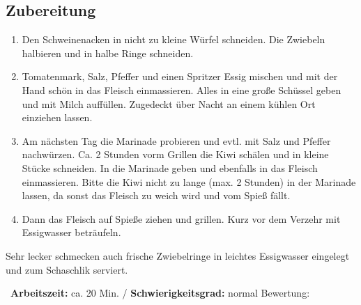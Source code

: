 \begin{minipage}[t]{0.58\textwidth}
\vspace{0pt}
\subsection*{Zubereitung}
\begin{enumerate}[leftmargin=*, itemindent=14pt]
\item Den Schweinenacken in nicht zu kleine Würfel schneiden. Die Zwiebeln halbieren und in halbe Ringe schneiden. 

\item Tomatenmark, Salz, Pfeffer und einen Spritzer Essig mischen und mit der Hand schön in das Fleisch einmassieren. Alles in eine große Schüssel geben und mit Milch auffüllen. Zugedeckt über Nacht an einem kühlen Ort einziehen lassen.

\item Am nächsten Tag die Marinade probieren und evtl. mit Salz und Pfeffer nachwürzen. Ca. 2 Stunden vorm Grillen die Kiwi schälen und in kleine Stücke schneiden. In die Marinade geben und ebenfalls in das Fleisch einmassieren. Bitte die Kiwi nicht zu lange (max. 2 Stunden) in der Marinade lassen, da sonst das Fleisch zu weich wird und vom Spieß fällt.

\item Dann das Fleisch auf Spieße ziehen und grillen. Kurz vor dem Verzehr mit Essigwasser beträufeln. 
\end{enumerate}
Sehr lecker schmecken auch frische Zwiebelringe in leichtes Essigwasser eingelegt und zum Schaschlik serviert.
\end{minipage}
\vfill
\decothreeright \, \textbf{Arbeitszeit:} ca. 20 Min. / \textbf{Schwierigkeitsgrad:} normal \decothreeleft \hfill Bewertung: \CIRCLE \CIRCLE \CIRCLE \CIRCLE \LEFTcircle 